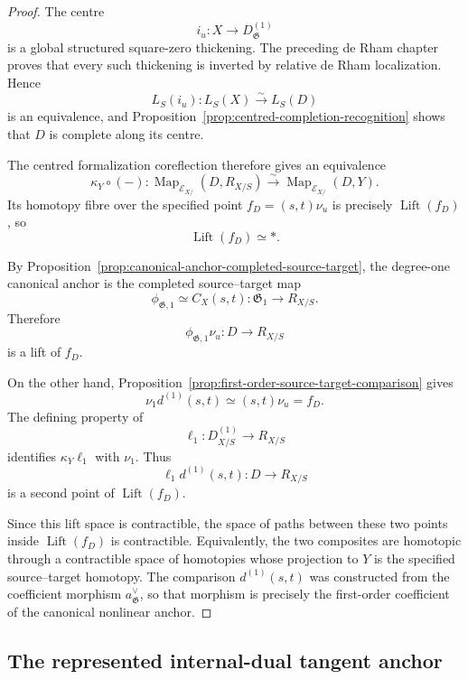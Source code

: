 \begin{proof}
The centre
\[
    i_u:
    X\longrightarrow D^{(1)}_{\mathfrak G}
\]
is a global structured square-zero thickening.  The preceding de Rham chapter
proves that every such thickening is inverted by relative de Rham
localization.  Hence
\[
    L_S(i_u):
    L_S(X)
    \xrightarrow{\sim}
    L_S(D)
\]
is an equivalence, and
Proposition~\ref{prop:centred-completion-recognition} shows that $D$ is
complete along its centre.

The centred formalization coreflection therefore gives an equivalence
\[
    \kappa_Y\circ(-):
    \operatorname{Map}_{\mathcal E_{X/}}(D,R_{X/S})
    \xrightarrow{\sim}
    \operatorname{Map}_{\mathcal E_{X/}}(D,Y).
\]
Its homotopy fibre over the specified point
$f_D=(s,t)\nu_u$ is precisely $\operatorname{Lift}(f_D)$, so
\[
    \operatorname{Lift}(f_D)\simeq *.
\]

By Proposition~\ref{prop:canonical-anchor-completed-source-target}, the
degree-one canonical anchor is the completed source--target map
\[
    \phi_{\mathfrak G,1}
    \simeq
    C_X(s,t):
    \mathfrak G_1
    \longrightarrow
    R_{X/S}.
\]
Therefore
\[
    \phi_{\mathfrak G,1}\nu_u:
    D\longrightarrow R_{X/S}
\]
is a lift of $f_D$.

On the other hand,
Proposition~\ref{prop:first-order-source-target-comparison} gives
\[
    \nu_1d^{(1)}(s,t)
    \simeq
    (s,t)\nu_u=f_D.
\]
The defining property of
\[
    \ell_1:
    D^{(1)}_{X/S}\longrightarrow R_{X/S}
\]
identifies $\kappa_Y\ell_1$ with $\nu_1$.  Thus
\[
    \ell_1d^{(1)}(s,t):
    D\longrightarrow R_{X/S}
\]
is a second point of $\operatorname{Lift}(f_D)$.

Since this lift space is contractible, the space of paths between these two
points inside $\operatorname{Lift}(f_D)$ is contractible.  Equivalently, the
two composites are homotopic through a contractible space of homotopies whose
projection to $Y$ is the specified source--target homotopy.  The comparison
$d^{(1)}(s,t)$ was constructed from the coefficient morphism
$a_{\mathfrak G}^{\vee}$, so that morphism is precisely the first-order
coefficient of the canonical nonlinear anchor.
\end{proof}

\subsection{The represented internal-dual tangent anchor}

